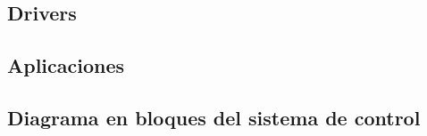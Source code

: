 \subsection{Drivers}

\subsection{Aplicaciones}

\begin{center}
    
    \label{fig:state.txt}
\end{center}


\subsection{Diagrama en bloques del sistema de control}